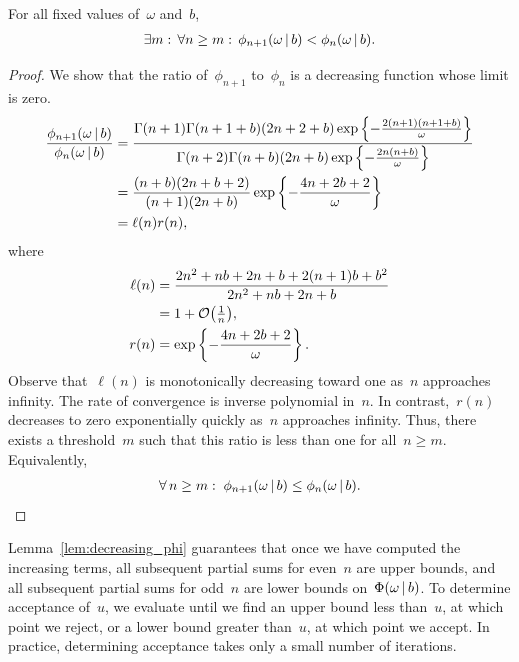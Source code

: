\begin{lemma}
  \label{lem:decreasing_phi}
  For all fixed values of~$\omega$ and~$b$,
  \begin{align*}
    \exists m: \, \forall  n \geq m: \,
    \phi_{n+1}(\omega \,|\, b) < \phi_{n}(\omega \,|\, b).
  \end{align*}
\end{lemma}

\begin{proof}
  We show that the ratio of~$\phi_{n+1}$ to~$\phi_{n}$ is a decreasing function
  whose limit is zero. 
  \begin{align*}
    \frac{\phi_{n+1}(\omega \,|\, b)}{\phi_n(\omega \,|\, b)} &= 
    \frac{ \Gamma(n+1) \Gamma(n+1+b) (2n + 2 + b) \exp \left \{ - \frac{2(n+1)(n+1+b)}{\omega} \right \}}
         { \Gamma(n+2) \Gamma(n+b) (2n + b) \exp \left \{ - \frac{2n(n+b)}{\omega} \right \}} \\
         &= 
         \frac{(n+b)(2n+b+2)}{(n+1)(2n+b)} 
         \exp \left \{ -\frac{4n +2b +2}{\omega}  \right \} \\
         &= \ell(n) r(n),
  \end{align*}
  where
  \begin{align*}
    \ell(n) &= \frac{2n^2+nb+2n+b + 2(n+1)b + b^2}{2n^2+nb+2n+b} \\
    &= 1 + \mathcal{O} \big(\tfrac{1}{n} \big), \\
    r(n) &= \exp \left \{ -\frac{4n +2b +2}{\omega}  \right \}.
  \end{align*}
  Observe that~$\ell(n)$ is monotonically decreasing toward one as~$n$
  approaches infinity.  The rate of convergence is inverse polynomial
  in~$n$.  In contrast,~$r(n)$ decreases to zero exponentially quickly
  as~$n$ approaches infinity.  Thus, there exists a threshold~$m$ such
  that this ratio is less than one for all~$n \geq m$. Equivalently,
  \begin{align*}
    \forall \, n \geq m: \; \phi_{n+1}(\omega \,|\, b) \leq \phi_{n}(\omega \,|\, b).
  \end{align*}
\end{proof}

Lemma~\ref{lem:decreasing_phi} guarantees that once we have computed
the increasing terms, all subsequent partial sums for even~$n$ are
upper bounds, and all subsequent partial sums for odd~$n$ are lower
bounds on~$\Phi({\omega}\,|\, b)$.  To determine acceptance of~$u$, we
evaluate until we find an upper bound less than~$u$, at which point we
reject, or a lower bound greater than~$u$, at which point we accept.
In practice, determining acceptance takes only a small number of iterations.

